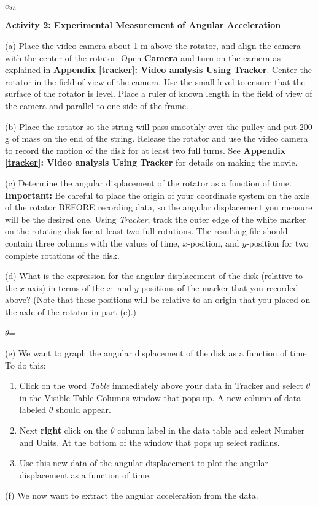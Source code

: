 \( \alpha _{th}= \)
\answerspace{5mm}

\textbf{Activity 2: Experimental Measurement of Angular Acceleration} 

(a) Place the video camera about 1 m above the rotator, and align the camera with the 
center of the rotator. Open \textbf{Camera} and turn on the camera as explained in \textbf{Appendix \ref{tracker}: Video analysis Using Tracker}. Center the rotator in the 
field of view of the camera. Use the small level to ensure that the surface of the rotator 
is level. Place a ruler of known length in the field of view of the camera and parallel to 
one side of the frame.

(b) Place the rotator so the string will pass smoothly over the pulley and put
200 g of mass on the end of the string. Release the rotator and use the
video camera to record the motion of the disk for at least two full turns. See  
\textbf{Appendix \ref{tracker}: Video analysis Using Tracker} for details on 
making the movie.

(c) Determine the angular displacement of the rotator as a function of time. \textbf{Important:} Be careful to place the origin of your coordinate system on the axle of the rotator BEFORE recording data, so the angular displacement you measure will be the desired one. Using \textit{Tracker}, track the outer edge of the white marker on the rotating disk for at least two full rotations. The resulting file should contain three columns with the values of time, $x$-position, and $y$-position for two complete rotations of the disk.

\pagebreak[2]
(d) What is the expression for the angular displacement of the disk (relative to the $x$ axis) in terms of the $x$- and $y$-positions of the marker that you recorded above? (Note that these positions will be relative to an origin that you placed on the axle of the rotator in part (c).)
\vspace{5mm}

\( \theta  \)= 
\bigskip

\newpage
(e) We want to graph the angular displacement of the disk as a function of time.
To do this:

\begin{enumerate}
\item Click on the word {\it Table} immediately above your data in Tracker and select \( \theta \) in the Visible Table Columns window that pops up.  A new column of data labeled \( \theta \) should appear.

\item Next {\bf right} click on the \( \theta \) column label in the data table and select Number and Units.  At the bottom of the window that pops up select radians. 

\item  Use this new data of the angular displacement to plot the angular displacement as a function of time. 

\end{enumerate}
(f) We now want to extract the angular acceleration from the data.

